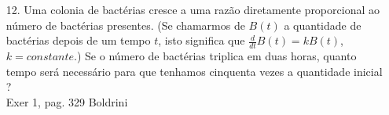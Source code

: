 \begin{itemize}
	\item [12.]  Uma colonia de bactérias cresce a uma razão diretamente proporcional ao número de bactérias presentes. (Se chamarmos de $B(t)$ a quantidade de bactérias depois de um tempo $t$, isto significa que $\frac{d}{dt}B(t)=kB(t)$, $k=constante$.) Se o número de bactérias triplica em duas horas, quanto tempo será necessário para que tenhamos cinquenta vezes a quantidade inicial ?\\
	 Exer 1, pag. 329 Boldrini
\end{itemize}

